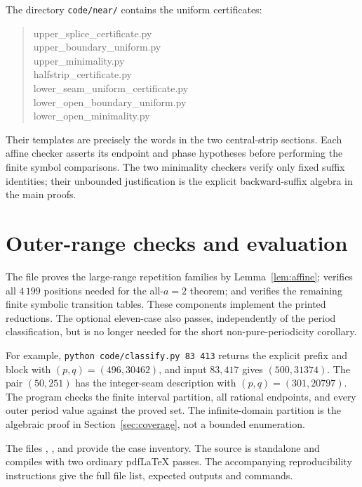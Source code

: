 \documentclass[11pt]{article}
\theoremstyle{remark}\newtheorem{remark}[theorem]{Remark}
\begin{document}
The directory \texttt{code/near/} contains the uniform certificates:
\begin{quote}\small\ttfamily
upper\_splice\_certificate.py\\
upper\_boundary\_uniform.py\\
upper\_minimality.py\\
halfstrip\_certificate.py\\
lower\_seam\_uniform\_certificate.py\\
lower\_open\_boundary\_uniform.py\\
lower\_open\_minimality.py
\end{quote}
Their templates are precisely the words in the two central-strip sections.
Each affine checker asserts its endpoint and phase hypotheses before
performing the finite symbol comparisons. The two minimality checkers
verify only fixed suffix identities; their unbounded justification is
the explicit backward-suffix algebra in the main proofs.

\section{Outer-range checks and evaluation}\label{app:checker}
The file  proves the large-range
repetition families by Lemma~\ref{lem:affine};
 verifies all $4\,199$ positions needed for
the all-$a=2$ theorem; and  verifies the remaining
finite symbolic transition tables. These components implement the printed reductions. The optional eleven-case
 also passes, independently of
the period classification, but is no longer needed for the short
non-pure-periodicity corollary.

For example, \texttt{python code/classify.py 83 413} returns the explicit
prefix and block with $(p,q)=(496,30462)$, and input $83,417$ gives
$(500,31374)$. The pair $(50,251)$ has the integer-seam
description with $(p,q)=(301,20797)$. The program
 checks the finite interval partition, all
rational endpoints, and every outer period value against the proved set.
The infinite-domain partition is the algebraic proof in
Section~\ref{sec:coverage}, not a bounded enumeration.

The files , , and
 provide the case inventory. The source
 is standalone and compiles with
two ordinary pdfLaTeX passes. The accompanying reproducibility instructions
give the full file list, expected outputs and commands.
\end{document}
